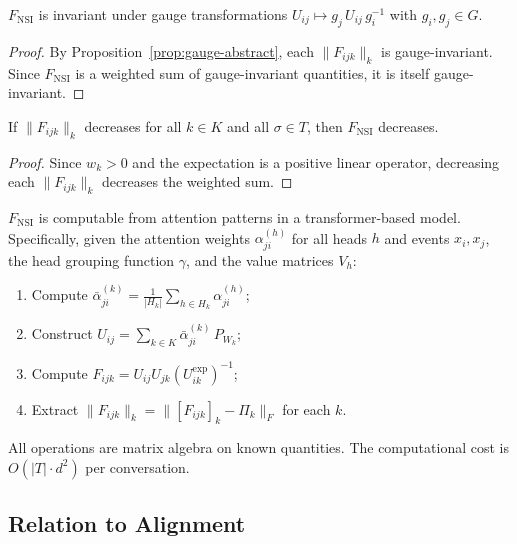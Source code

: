 \begin{proposition}
\label{prop:fnsi-gauge}
$F_{\mathrm{NSI}}$ is invariant under gauge transformations $U_{ij} \mapsto g_j\,
U_{ij}\, g_i^{-1}$ with $g_i, g_j \in G$.
\end{proposition}

\begin{proof}
By Proposition~\ref{prop:gauge-abstract}, each $\|F_{ijk}\|_k$ is gauge-invariant.
Since $F_{\mathrm{NSI}}$ is a weighted sum of gauge-invariant quantities, it is itself
gauge-invariant.
\end{proof}

\begin{proposition}[Monotonicity]
\label{prop:fnsi-monotone}
If $\|F_{ijk}\|_k$ decreases for all $k \in K$ and all $\sigma \in T$, then
$F_{\mathrm{NSI}}$ decreases.
\end{proposition}

\begin{proof}
Since $w_k > 0$ and the expectation is a positive linear operator, decreasing each
$\|F_{ijk}\|_k$ decreases the weighted sum.
\end{proof}

\begin{proposition}[Computability]
\label{prop:fnsi-computable}
$F_{\mathrm{NSI}}$ is computable from attention patterns in a transformer-based model.
Specifically, given the attention weights $\alpha_{ji}^{(h)}$ for all heads $h$ and events
$x_i, x_j$, the head grouping function $\gamma$, and the value matrices $V_h$:
\begin{enumerate}
    \item Compute $\bar{\alpha}_{ji}^{(k)} = \frac{1}{|H_k|} \sum_{h \in H_k}
    \alpha_{ji}^{(h)}$;
    \item Construct $U_{ij} = \sum_{k \in K} \bar{\alpha}_{ji}^{(k)}\, P_{W_k}$;
    \item Compute $F_{ijk} = U_{ij} U_{jk} (U_{ik}^{\exp})^{-1}$;
    \item Extract $\|F_{ijk}\|_k = \|[F_{ijk}]_k - \Pi_k\|_F$ for each $k$.
\end{enumerate}
All operations are matrix algebra on known quantities. The computational cost is
$O(|T| \cdot d^2)$ per conversation.
\end{proposition}

\subsection{Relation to Alignment}

